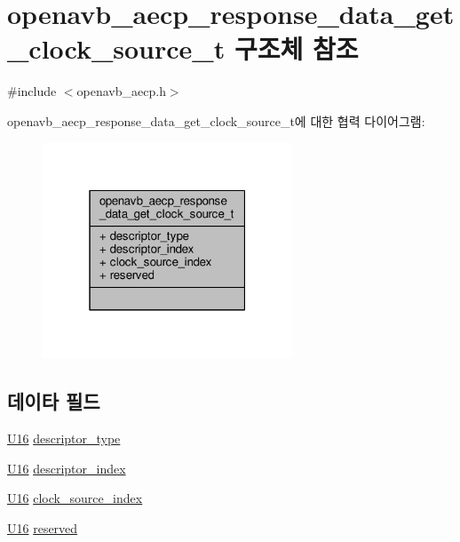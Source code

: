 \hypertarget{structopenavb__aecp__response__data__get__clock__source__t}{}\section{openavb\+\_\+aecp\+\_\+response\+\_\+data\+\_\+get\+\_\+clock\+\_\+source\+\_\+t 구조체 참조}
\label{structopenavb__aecp__response__data__get__clock__source__t}


{\ttfamily \#include $<$openavb\+\_\+aecp.\+h$>$}



openavb\+\_\+aecp\+\_\+response\+\_\+data\+\_\+get\+\_\+clock\+\_\+source\+\_\+t에 대한 협력 다이어그램\+:
\nopagebreak
\begin{figure}[H]
\begin{center}
\leavevmode
\includegraphics[width=211pt]{structopenavb__aecp__response__data__get__clock__source__t__coll__graph}
\end{center}
\end{figure}
\subsection*{데이타 필드}
\begin{DoxyCompactItemize}
\item 
\hyperlink{openavb__types__base__pub_8h_a0a0a322d5fa4a546d293a77ba8b4a71f}{U16} \hyperlink{structopenavb__aecp__response__data__get__clock__source__t_a1e231d7874aada5925b29affc76782cc}{descriptor\+\_\+type}
\item 
\hyperlink{openavb__types__base__pub_8h_a0a0a322d5fa4a546d293a77ba8b4a71f}{U16} \hyperlink{structopenavb__aecp__response__data__get__clock__source__t_ab26fb363c24b9a2a4391f9171c981b08}{descriptor\+\_\+index}
\item 
\hyperlink{openavb__types__base__pub_8h_a0a0a322d5fa4a546d293a77ba8b4a71f}{U16} \hyperlink{structopenavb__aecp__response__data__get__clock__source__t_ab8a3ce0c7efc03bc176997db162ad53f}{clock\+\_\+source\+\_\+index}
\item 
\hyperlink{openavb__types__base__pub_8h_a0a0a322d5fa4a546d293a77ba8b4a71f}{U16} \hyperlink{structopenavb__aecp__response__data__get__clock__source__t_ac15a687d635cc969d1bfab4d96858b77}{reserved}
\end{DoxyCompactItemize}



